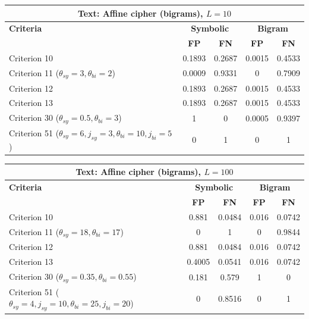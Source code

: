 \begin{center}
\renewcommand{\arraystretch}{1.2}
\setlength{\tabcolsep}{6pt}
\begin{tabular}{|l||c|c||c|c|}
\hline
\multicolumn{5}{|c|}{\textbf{Text: Affine cipher (bigrams), $L=10$}} \\
\hline
\textbf{Criteria} & \multicolumn{2}{c||}{\textbf{Symbolic}} & \multicolumn{2}{c|}{\textbf{Bigram}} \\
\hline
 & \textbf{FP} & \textbf{FN} & \textbf{FP} & \textbf{FN} \\
\hline
Criterion 10 & 0.1893 & 0.2687 & 0.0015 & 0.4533 \\
Criterion 11 ($\theta_{sy}=3, \theta_{bi}=2$) & 0.0009 & 0.9331 & 0 & 0.7909 \\
Criterion 12 & 0.1893 & 0.2687 & 0.0015 & 0.4533 \\
Criterion 13 & 0.1893 & 0.2687 & 0.0015 & 0.4533 \\
Criterion 30 ($\theta_{sy}=0.5, \theta_{bi}=3$) & 1 & 0 & 0.0005 & 0.9397 \\
Criterion 51 ($\theta_{sy}=6, j_{sy}=3, \theta_{bi}=10, j_{bi}=5$) & 0 & 1 & 0 & 1 \\
\hline
\end{tabular}
\end{center}

\begin{center}
\renewcommand{\arraystretch}{1.2}
\setlength{\tabcolsep}{6pt}
\begin{tabular}{|l||c|c||c|c|}
\hline
\multicolumn{5}{|c|}{\textbf{Text: Affine cipher (bigrams), $L=100$}} \\
\hline
\textbf{Criteria} & \multicolumn{2}{c||}{\textbf{Symbolic}} & \multicolumn{2}{c|}{\textbf{Bigram}} \\
\hline
 & \textbf{FP} & \textbf{FN} & \textbf{FP} & \textbf{FN} \\
\hline
Criterion 10 & 0.881 & 0.0484 & 0.016 & 0.0742 \\
Criterion 11 ($\theta_{sy}=18, \theta_{bi}=17$) & 0 & 1 & 0 & 0.9844 \\
Criterion 12 & 0.881 & 0.0484 & 0.016 & 0.0742 \\
Criterion 13 & 0.4005 & 0.0541 & 0.016 & 0.0742 \\
Criterion 30 ($\theta_{sy}=0.35, \theta_{bi}=0.55$) & 0.181 & 0.579 & 1 & 0 \\
Criterion 51 ($\theta_{sy}=4, j_{sy}=10, \theta_{bi}=25, j_{bi}=20$) & 0 & 0.8516 & 0 & 1 \\
\hline
\end{tabular}
\end{center}


